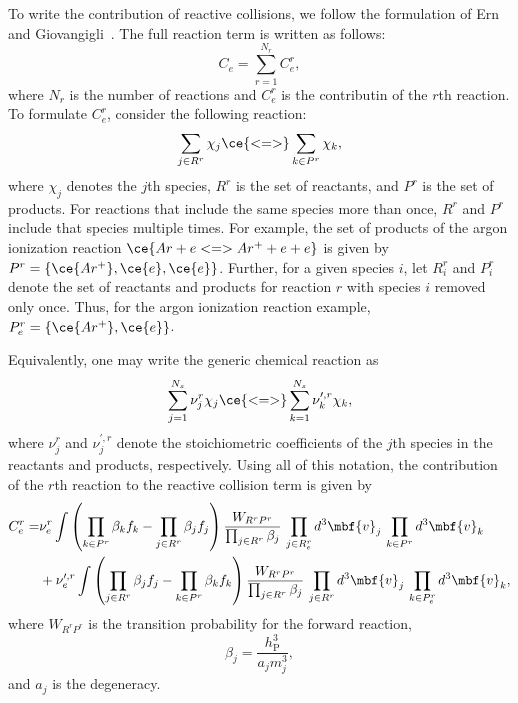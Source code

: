 To write the contribution of reactive collisions, we follow the
formulation of Ern and Giovangigli~\cite{}.  The full reaction term is
written as follows:
%
\begin{equation*}
C_e = \sum_{r=1}^{N_r} C_e^r,
\end{equation*}
%
where $N_r$ is the number of reactions and $C_e^r$ is the contributin
of the $r$th reaction.  To formulate $C_e^r$, consider the following
reaction:
%
\begin{equation*}
\sum_{j \in R^r} \chi_j
\ce{<=>}
\sum_{k \in P^r} \chi_k,
\end{equation*}
%
where $\chi_j$ denotes the $j$th species, $R^r$ is the set of
reactants, and $P^r$ is the set of products.  For reactions that
include the same species more than once, $R^r$ and $P^r$ include that
species multiple times.  For example, the set of products of the argon
ionization reaction $\ce{Ar + e <=> Ar^+ + e + e}$ is given by $P^r =
\{\ce{Ar^+}, \ce{e}, \ce{e}\}$.  Further, for a given species $i$, let
$R^r_i$ and $P^r_i$ denote the set of reactants and products for
reaction $r$ with species $i$ removed only once.  Thus, for the argon
ionization reaction example, $P^r_e = \{\ce{Ar^+}, \ce{e}\}$.

Equivalently, one may write the generic chemical reaction as
%
\begin{equation*}
\sum_{j =1}^{N_s} \nu^{r}_j\chi_j
\ce{<=>}
\sum_{k=1}^{N_s} \nu^{\prime,r}_k \chi_k,
\end{equation*}
%
where $\nu^r_{j}$ and $\nu^{\prime,r}_j$ denote the stoichiometric
coefficients of the $j$th species in the reactants and products,
respectively.  Using all of this notation, the contribution of the
$r$th reaction to the reactive collision term is given by
%
\begin{align*}
C_e^r
=&
\nu_e^r \int \left( \prod_{k \in P^r} \beta_k f_k - \prod_{j \in R^r} \beta_j f_j \right)
\frac{W_{R^r P^r}}{\prod_{j \in R^r} \beta_j} \,
\prod_{j \in R^r_e} d^3 \mbf{v}_j \, \prod_{k \in P^r} d^3 \mbf{v}_k\\
&+
\nu_e^{\prime,r} \int \left( \prod_{j \in R^r} \beta_j f_j - \prod_{k \in P^r} \beta_k f_k \right)
\frac{W_{R^r P^r}}{\prod_{j \in R^r} \beta_j} \,
\prod_{j \in R^r} d^3 \mbf{v}_j \, \prod_{k \in P^r_e} d^3 \mbf{v}_k,
\end{align*}
%
where $W_{R^r P^r}$ is the transition probability for the forward
reaction,
%
\begin{equation*}
\beta_j = \frac{h^3_{\mathrm{P}}}{a_j m_j^3},
\end{equation*}
%
and $a_j$ is the degeneracy.

